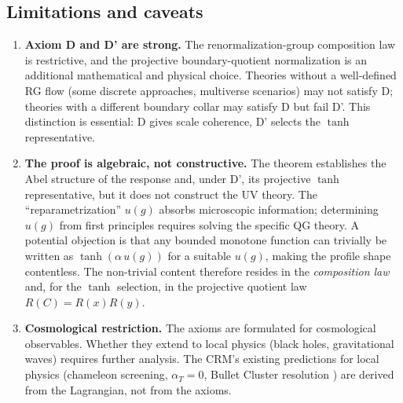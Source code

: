 \documentclass[aps,prd,twocolumn,superscriptaddress,nofootinbib]{revtex4-2}
\begin{document}
\subsection{Limitations and caveats}

\begin{enumerate}
\item \textbf{Axiom D and D' are strong.} The renormalization-group composition law is restrictive, and the projective boundary-quotient normalization is an additional mathematical and physical choice. Theories without a well-defined RG flow (some discrete approaches, multiverse scenarios) may not satisfy D; theories with a different boundary collar may satisfy D but fail D'. This distinction is essential: D gives scale coherence, D' selects the $\tanh$ representative.

\item \textbf{The proof is algebraic, not constructive.} The theorem establishes the Abel structure of the response and, under D', its projective $\tanh$ representative, but it does not construct the UV theory. The ``reparametrization'' $u(g)$ absorbs microscopic information; determining $u(g)$ from first principles requires solving the specific QG theory. A potential objection is that any bounded monotone function can trivially be written as $\tanh(\alpha\,u(g))$ for a suitable $u(g)$, making the profile shape contentless. The non-trivial content therefore resides in the \textit{composition law} and, for the $\tanh$ selection, in the projective quotient law $R(C)=R(x)R(y)$.

\item \textbf{Cosmological restriction.} The axioms are formulated for cosmological observables. Whether they extend to local physics (black holes, gravitational waves) requires further analysis. The CRM's existing predictions for local physics (chameleon screening, $\alpha_T = 0$, Bullet Cluster resolution \cite{Geiger2026b,Geiger2026c,Geiger2026d}) are derived from the Lagrangian, not from the axioms.


\end{enumerate}
\end{document}
